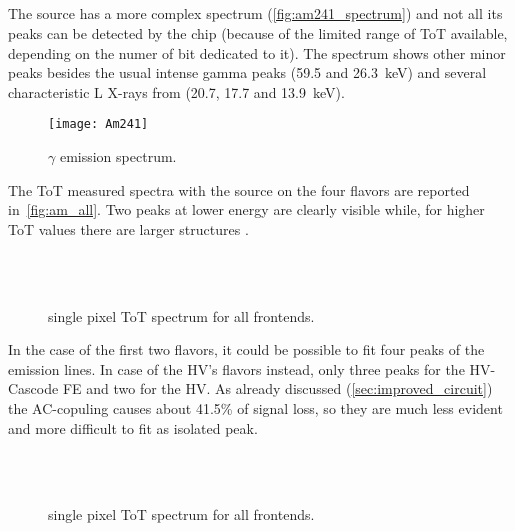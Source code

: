 \subsection{}


The  source has a more complex spectrum (\autoref{fig:am241_spectrum}) and not all its peaks can be detected by the chip (because of the limited range of ToT available, depending on the numer of bit dedicated to it). The spectrum shows other minor peaks besides the usual intense gamma peaks (59.5 and \SI{26.3}{keV}) and several characteristic L X-rays from  (20.7, 17.7 and \SI{13.9}{keV}).\\ 
%
\begin{figure}[h!]
\centering
\texttt{[image: Am241]}
\caption{ $\gamma$ emission spectrum.}
\label{fig:am241_spectrum}
\end{figure}
%
The ToT measured spectra with the  source on the four flavors are reported in~\autoref{fig:am_all}. Two peaks at lower energy are clearly visible while, for higher ToT values there are larger structures .

\begin{figure}[h!]
\centering
{}\quad
{}\\
\quad
{}\\
\caption{ single pixel ToT spectrum for all frontends.}
\label{fig:am_all}
\end{figure}
%
In the case of the first two flavors, it could be possible to fit four peaks of the emission lines. In case of the HV's flavors instead, only three peaks for the HV-Cascode FE and two for the HV. As already discussed (\autoref{sec:improved_circuit}) the AC-copuling causes about 41.5\% of signal loss, so they are much less evident and more difficult to fit as isolated peak.

\begin{figure}[h!]
\centering
{}\quad
{}\\
\quad
{}\\
\caption{ single pixel ToT spectrum for all frontends.}
\label{fig:cd_all}
\end{figure}
